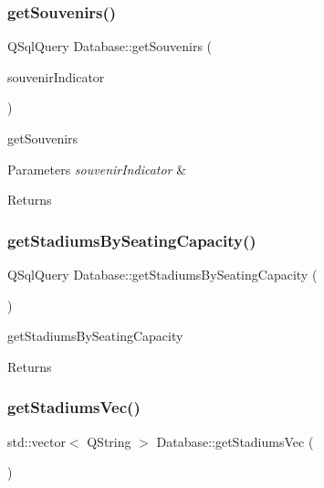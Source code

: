 \subsubsection{\texorpdfstring{get\+Souvenirs()}{getSouvenirs()}}
{\footnotesize\ttfamily Q\+Sql\+Query Database\+::get\+Souvenirs (\begin{DoxyParamCaption}\item[{Q\+String}]{souvenir\+Indicator }\end{DoxyParamCaption})}



get\+Souvenirs 


\begin{DoxyParams}{Parameters}
{\em souvenir\+Indicator} & \\
\hline
\end{DoxyParams}
\begin{DoxyReturn}{Returns}

\end{DoxyReturn}
\mbox{\label{class_database_acb70cac23e455f88da5d697a2adb5ae6}} 
\subsubsection{\texorpdfstring{get\+Stadiums\+By\+Seating\+Capacity()}{getStadiumsBySeatingCapacity()}}
{\footnotesize\ttfamily Q\+Sql\+Query Database\+::get\+Stadiums\+By\+Seating\+Capacity (\begin{DoxyParamCaption}{ }\end{DoxyParamCaption})}



get\+Stadiums\+By\+Seating\+Capacity 

\begin{DoxyReturn}{Returns}

\end{DoxyReturn}
\mbox{\label{class_database_a40f0c2887aca4a26932b11155315dcd8}} 
\subsubsection{\texorpdfstring{get\+Stadiums\+Vec()}{getStadiumsVec()}}
{\footnotesize\ttfamily std\+::vector$<$ Q\+String $>$ Database\+::get\+Stadiums\+Vec (\begin{DoxyParamCaption}{ }\end{DoxyParamCaption})}



